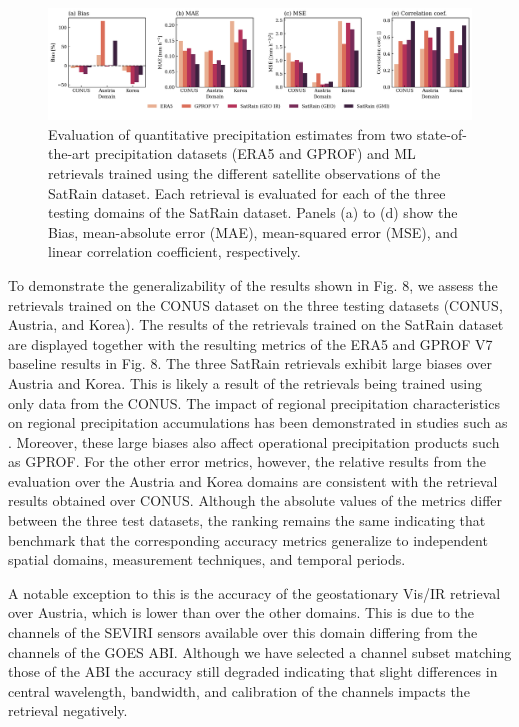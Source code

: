 \documentclass[11pt]{article}
\begin{document}
\begin{figure}[htbp] %
	\centering
	\includegraphics[width=1.0\textwidth]{figures/fig10}
	\caption{
	Evaluation of quantitative precipitation estimates from two state-of-the-art
	precipitation datasets (ERA5 and GPROF) and ML retrievals trained using the
	different satellite observations of the SatRain dataset. Each retrieval is
	evaluated for each of the three testing domains of the SatRain dataset. Panels
	(a) to (d) show the Bias, mean-absolute error (MAE), mean-squared error (MSE),
	and linear correlation coefficient, respectively.
	}
	\label{fig:sensor_comparison}
\end{figure}

To demonstrate the generalizability of the results shown in Fig. 8, we assess
the retrievals trained on the CONUS dataset on the three testing datasets
(CONUS, Austria, and Korea). The results of the retrievals trained on the
SatRain dataset are displayed together with the resulting metrics of the ERA5
and GPROF V7 baseline results in Fig. 8. The three SatRain retrievals exhibit
large biases over Austria and Korea. This is likely a result of the retrievals
being trained using only data from the CONUS. The impact of regional
precipitation characteristics on regional precipitation accumulations has been
demonstrated in studies such as . Moreover, these large biases also affect
operational precipitation products such as GPROF. For the other error metrics,
however, the relative results from the evaluation over the Austria and Korea
domains are consistent with the retrieval results obtained over CONUS. Although
the absolute values of the metrics differ between the three test datasets, the
ranking remains the same indicating that benchmark that the corresponding
accuracy metrics generalize to independent spatial domains, measurement
techniques, and temporal periods.


A notable exception to this is the accuracy of the geostationary Vis/IR
retrieval over Austria, which is lower than over the other domains. This is due
to the channels of the SEVIRI sensors available over this domain differing from
the channels of the GOES ABI. Although we have selected a channel subset
matching those of the ABI the accuracy still degraded indicating that slight
differences in central wavelength, bandwidth, and calibration of the channels
impacts the retrieval negatively.
\end{document}
